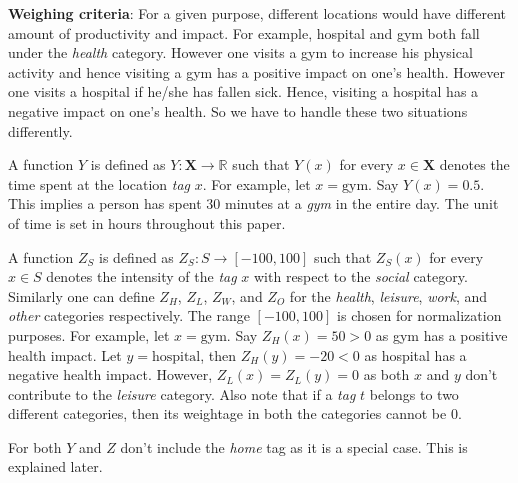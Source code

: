\documentclass[conference]{IEEEtran}
\begin{document}
\textbf{Weighing criteria}: For a given purpose, different locations would have different amount of productivity and impact. For example, hospital and gym both fall under the \textit{health} category. However one visits a gym to increase his physical activity and hence visiting a gym has a positive impact on one\rq s health. However one visits a hospital if he/she has fallen sick. Hence, visiting a hospital has a negative impact on one\rq s health. So we have to handle these two situations differently.

A function $Y$ is defined as $Y:\mathbf{X} \rightarrow \mathbb{R}$ such that $Y(x)$ for every $x \in \mathbf{X}$ denotes the time spent at the location \textit{tag} $x$. For example, let $x = \text{gym}$. Say $Y(x) = 0.5$. This implies a person has spent $30$ minutes at a \textit{gym} in the entire day. The unit of time is set in hours throughout this paper.

A function $Z_S$ is defined as $Z_S:S \rightarrow [-100, 100]$ such that $Z_S(x)$ for every $x \in S$ denotes the intensity of the \textit{tag} $x$ with respect to the \textit{social} category. Similarly one can define $Z_H$, $Z_L$, $Z_W$, and $Z_O$ for the \textit{health}, \textit{leisure}, \textit{work}, and \textit{other} categories respectively. The range $[-100, 100]$ is chosen for normalization purposes. For example, let $x = \text{gym}$. Say $Z_H(x) = 50 > 0$ as gym has a positive health impact. Let $y = \text{hospital}$, then $Z_H(y) = -20 < 0$ as hospital has a negative health impact. However, $Z_L(x) = Z_L(y) = 0$ as both $x$ and $y$ don\rq t contribute to the \textit{leisure} category. Also note that if a \textit{tag} $t$ belongs to two different categories, then its weightage in both the categories cannot be $0$.

For both $Y$ and $Z$ don\rq t include the \textit{home} tag as it is a special case. This is explained later.
\end{document}
